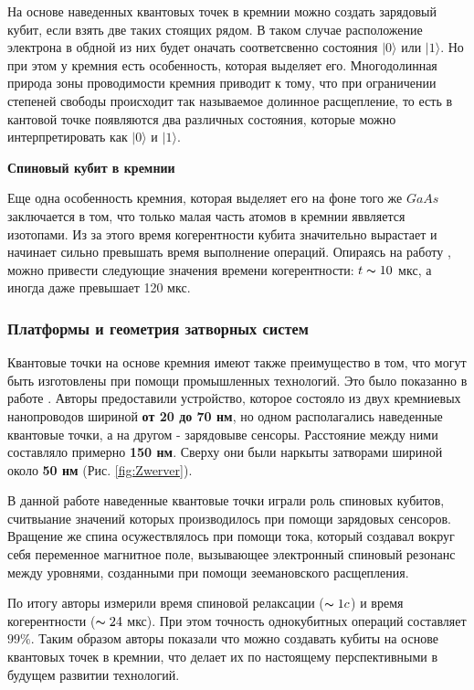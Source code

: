 \documentclass[a4paper,14pt]{extreport} %
\newcommand{\ket}[1]{|#1\rangle}
\begin{document}
На основе наведенных квантовых точек в кремнии можно создать зарядовый кубит, если 
взять две таких стоящих рядом. В таком случае расположение электрона в обдной из них
будет оначать соответсвенно состояния $\ket{0}$ или $\ket{1}$. Но при этом у кремния есть особенность,
которая выделяет его. Многодолинная природа зоны проводимости кремния приводит к тому, что при 
ограничении степеней свободы происходит так называемое долинное расщепление, то есть в кантовой точке
появляются два различных состояния, которые можно интерпретировать как $\ket{0}$ и $\ket{1}$.


\textbf{Спиновый кубит в кремнии}

Еще одна особенность кремния, которая выделяет его на фоне того же $GaAs$ заключается в том, что только
малая часть атомов в кремнии яввляется изотопами. Из за этого время когерентности кубита значительно вырастает
и начинает сильно превышать время выполнение операций. Опираясь на работу \cite{Chatterjee2021}, можно
привести следующие значения времени когерентности: $t \thicksim 10$ мкс, а иногда
даже превышает 120 мкс.
\subsubsection{Платформы и геометрия затворных систем}
\label{sec:geometry}

Квантовые точки на основе кремния имеют также преимущество в том, что могут быть
изготовлены при помощи промышленных технологий. Это было показанно в работе 
\cite{Zwerver2022}. Авторы предоставили устройство, которое состояло из двух кремниевых 
нанопроводов шириной \textbf{от 20 до 70 нм}, но одном располагались наведенные квантовые точки, 
а на другом - зарядовыве сенсоры.
Расстояние между ними составляло примерно \textbf{150 нм}.
Сверху они были наркыты затворами шириной около \textbf{50 нм} (Рис. \ref{fig:Zwerver}).

В данной работе наведенные квантовые точки играли роль спиновых кубитов, считвыание значений которых
производилось при помощи зарядовых сенсоров. Вращение же спина осужествлялось при помощи тока, который
создавал вокруг себя переменное магнитное поле, вызывающее электронный спиновый резонанс между уровнями,
созданными при помощи зеемановского расщепления.

По итогу авторы измерили время спиновой релаксации ($\thicksim 1 c$) и время когерентности 
($\thicksim 24$ мкс). При этом точность однокубитных операций составляет $99\%$. 
Таким образом авторы показали что можно создавать кубиты на основе квантовых точек в кремнии, что
делает их по настоящему перспективными в будущем развитии технологий.
\end{document}
